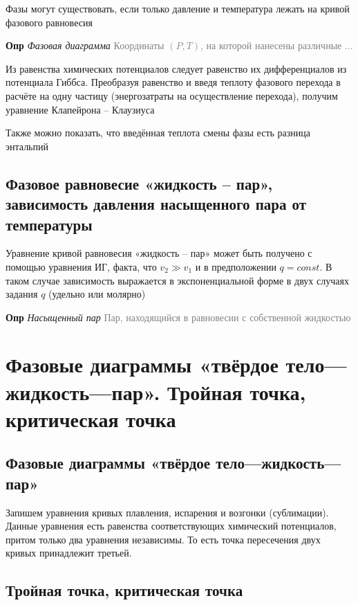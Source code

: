 \documentclass[a4paper, 14pt]{article}
\begin{document}
    Фазы могут существовать, если только давление и температура лежать на кривой фазового равновесия
    
    \textbf{Опр} \textit{Фазовая диаграмма} \textcolor{gray}{Координаты $(P, T)$, на которой нанесены различные ...}
    
    Из равенства химических потенциалов следует равенство их дифференциалов из потенциала Гиббса.
    Преобразуя равенство и введя теплоту фазового перехода в расчёте на одну частицу (энергозатраты на осуществление
    перехода), получим уравнение Клапейрона -- Клаузиуса
    
    Также можно показать, что введённая теплота смены фазы есть разница энтальпий
    
    \subsection{Фазовое равновесие «жидкость -- пар», зависимость давления насыщенного пара от температуры}
    
    Уравнение кривой равновесия «жидкость -- пар» может быть получено с помощью уравнения ИГ, факта, что $v_2 \gg
    v_1$ и в предположении $q = const$.
    В таком случае зависимость выражается в экспоненциальной форме в двух случаях задания $q$ (удельно или молярно)
    
    \textbf{Опр} \textit{Насыщенный пар} \textcolor{gray}{Пар, находящийся в равновесии с собственной жидкостью}
    
    \section{Фазовые диаграммы «твёрдое тело—жидкость—пар».
    Тройная точка, критическая точка}
    
    \subsection{Фазовые диаграммы «твёрдое тело—жидкость—пар»}
    
    Запишем уравнения кривых плавления, испарения и возгонки (сублимации).
    Данные уравнения есть равенства соответствующих химический потенциалов, притом только два уравнения независимы.
    То есть точка пересечения двух кривых принадлежит третьей.
    
    \subsection{Тройная точка, критическая точка}
    
\end{document}
